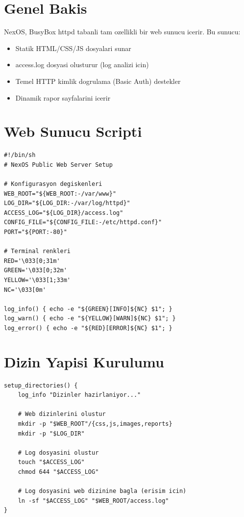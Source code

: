 \documentclass[12pt,a4paper]{report}
\begin{document}
\section{Genel Bakis}

NexOS, BusyBox httpd tabanli tam ozellikli bir web sunucu icerir. Bu sunucu:

\begin{itemize}
    \item Statik HTML/CSS/JS dosyalari sunar
    \item access.log dosyasi olusturur (log analizi icin)
    \item Temel HTTP kimlik dogrulama (Basic Auth) destekler
    \item Dinamik rapor sayfalarini icerir
\end{itemize}

\section{Web Sunucu Scripti}

\begin{lstlisting}[style=bashstyle,caption={webserver.sh - Konfigurasyon}]
#!/bin/sh
# NexOS Public Web Server Setup

# Konfigurasyon degiskenleri
WEB_ROOT="${WEB_ROOT:-/var/www}"
LOG_DIR="${LOG_DIR:-/var/log/httpd}"
ACCESS_LOG="${LOG_DIR}/access.log"
CONFIG_FILE="${CONFIG_FILE:-/etc/httpd.conf}"
PORT="${PORT:-80}"

# Terminal renkleri
RED='\033[0;31m'
GREEN='\033[0;32m'
YELLOW='\033[1;33m'
NC='\033[0m'

log_info() { echo -e "${GREEN}[INFO]${NC} $1"; }
log_warn() { echo -e "${YELLOW}[WARN]${NC} $1"; }
log_error() { echo -e "${RED}[ERROR]${NC} $1"; }
\end{lstlisting}

\section{Dizin Yapisi Kurulumu}

\begin{lstlisting}[style=bashstyle,caption={Dizin Olusturma}]
setup_directories() {
    log_info "Dizinler hazirlaniyor..."
    
    # Web dizinlerini olustur
    mkdir -p "$WEB_ROOT"/{css,js,images,reports}
    mkdir -p "$LOG_DIR"
    
    # Log dosyasini olustur
    touch "$ACCESS_LOG"
    chmod 644 "$ACCESS_LOG"
    
    # Log dosyasini web dizinine bagla (erisim icin)
    ln -sf "$ACCESS_LOG" "$WEB_ROOT/access.log"
}
\end{lstlisting}
\end{document}
